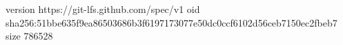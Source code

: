 version https://git-lfs.github.com/spec/v1
oid sha256:51bbe635f9ea86503686b3f6197173077e50dc0ccf6102d56ceb7150ec2fbeb7
size 786528
